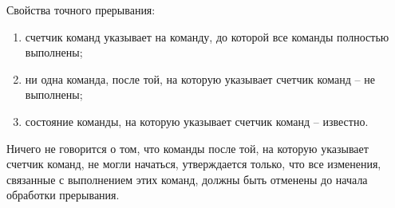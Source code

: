 Свойства точного прерывания:
\begin{enumerate}
    \item счетчик команд указывает на команду, до которой все команды полностью выполнены;
    \item ни одна команда, после той, на которую указывает счетчик команд – не выполнены;
    \item состояние команды, на которую указывает счетчик команд – известно. 
\end{enumerate} 
    
Ничего не говорится о том, что команды после той, на которую указывает счетчик команд, не могли начаться, утверждается только, что все изменения, связанные с выполнением этих команд, должны быть отменены до начала обработки прерывания.
